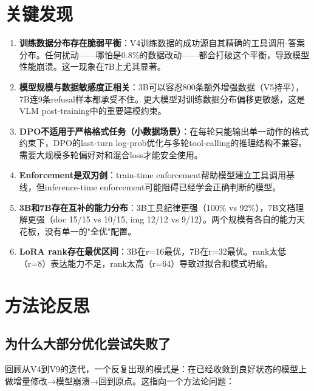 \documentclass[fontset=none,11pt,a4paper]{ctexart}
\begin{document}
\section{关键发现}

\begin{enumerate}[label=\textbf{\arabic*}. , leftmargin=*]

\item \textbf{训练数据分布存在脆弱平衡}：V4训练数据的成功源自其精确的工具调用-答案分布。任何扰动------哪怕是0.8\%的数据改动------都会打破这个平衡，导致模型性能崩溃。这一现象在7B上尤其显著。

\item \textbf{模型规模与数据敏感度正相关}：3B可以容忍800条额外增强数据（V5持平），7B连9条refusal样本都承受不住。更大模型对训练数据分布偏移更敏感，这是VLM post-training中的重要建模约束。

\item \textbf{DPO不适用于严格格式任务（小数据场景）}：在每轮只能输出单一动作的格式约束下，DPO的last-turn log-prob优化与多轮tool-calling的推理结构不兼容。需要大规模多轮偏好对和混合loss才能安全使用。

\item \textbf{Enforcement是双刃剑}：train-time enforcement帮助模型建立工具调用基线，但inference-time enforcement可能阻碍已经学会正确判断的模型。

\item \textbf{3B和7B存在互补的能力分布}：3B工具纪律更强（100\% vs 92\%），7B文档理解更强（doc 15/15 vs 10/15, img 12/12 vs 9/12）。两个规模有各自的能力天花板，没有单一的"全优"配置。

\item \textbf{LoRA rank存在最优区间}：3B在r=16最优，7B在r=32最优。rank太低（r=8）表达能力不足，rank太高（r=64）导致过拟合和模式坍缩。

\end{enumerate}

\section{方法论反思}

\subsection{为什么大部分优化尝试失败了}

回顾从V4到V9的迭代，一个反复出现的模式是：在已经收敛到良好状态的模型上做增量修改→模型崩溃→回到原点。这指向一个方法论问题：
\end{document}
